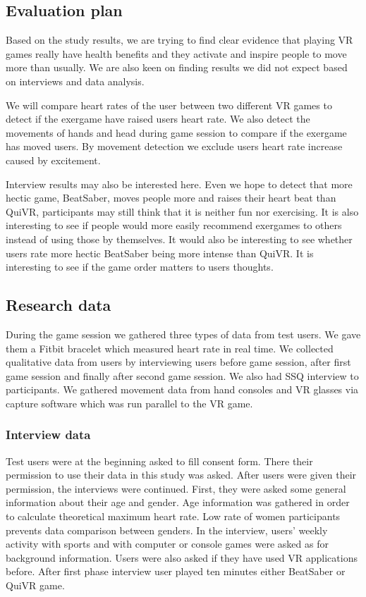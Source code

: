 \documentclass{sig-alternate-05-2015}
\begin{document}
\subsection{Evaluation plan}
Based on the study results, we are trying to find clear evidence that 
playing VR games really have health benefits and they activate and 
inspire people to move more than usually. We are also keen on finding 
results we did not expect based on interviews and data analysis.

We will compare heart rates of the user between two different VR games 
to detect if the exergame have raised users heart rate. We also detect 
the movements of hands and head during game session to compare if the 
exergame has moved users. By movement detection we exclude users heart 
rate increase caused by excitement. 

Interview results may also be interested here. Even we hope to detect 
that more hectic game, BeatSaber, moves people more and raises their 
heart beat than QuiVR, participants may still think that it is neither 
fun nor exercising. It is also interesting to see if people would more 
easily recommend exergames to others instead of using those by themselves. 
It would also be interesting to see whether users rate more hectic 
BeatSaber being more intense than QuiVR. It is interesting to see if the 
game order matters to users thoughts.

\subsection{Research data}
During the game session we gathered three types of data from test users. 
We gave them a Fitbit bracelet which measured heart rate in real time. 
We collected qualitative data from users by interviewing users before 
game session, after first game session and finally after second game 
session. We also had SSQ interview to participants. We gathered movement 
data from hand consoles and VR glasses via capture software which was 
run parallel to the VR game.
\subsubsection{Interview data}
Test users were at the beginning asked to fill consent form. 
There their permission to use their data in this study was asked. After 
users were given their permission, the interviews were continued. First, 
they were asked some general information about their age and gender. 
Age information was gathered in order to calculate theoretical maximum 
heart rate. Low rate of women participants prevents data comparison 
between genders. In the interview, users’ weekly activity with sports 
and with computer or console games were asked as for background information. 
Users were also asked if they have used VR applications before. After first 
phase interview user played ten minutes either BeatSaber or QuiVR game. 
\end{document}
